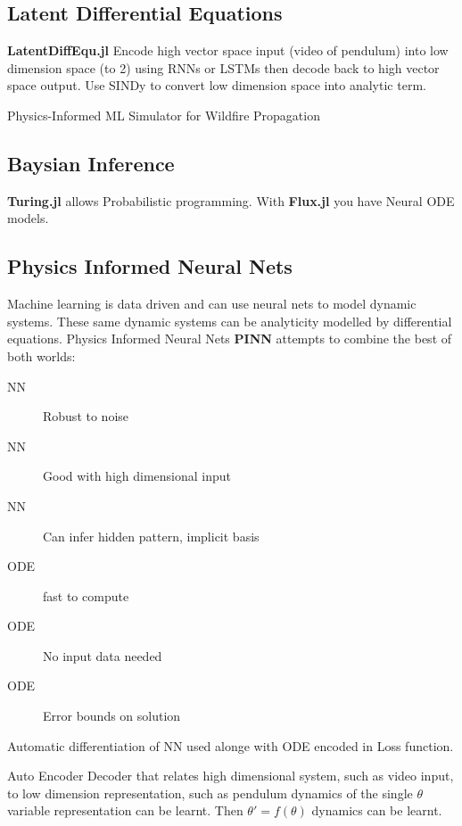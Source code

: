 \subsection{Latent Differential Equations}

{\bf LatentDiffEqu.jl} Encode high vector space input (video of pendulum)  into low dimension space (to 2) using RNNs or LSTMs  then decode back to high vector space output. Use SINDy to convert low dimension space into analytic term.

Physics-Informed ML Simulator for Wildfire Propagation

\subsection{Baysian Inference }

{\bf Turing.jl} allows Probabilistic programming. With {\bf Flux.jl} you have Neural ODE models.

\subsection{Physics Informed Neural Nets}

Machine learning is data driven and can use neural nets to model dynamic systems. These same dynamic systems can be analyticity modelled by differential equations. Physics Informed Neural Nets {\bf PINN} attempts to combine the best of both worlds:

\begin{description}
\item[NN] Robust to noise
\item[NN] Good with high dimensional input
\item [NN] Can infer hidden pattern, implicit basis
\item [ODE] fast to compute
\item [ODE] No input data needed
\item [ODE] Error bounds on solution
\end{description}

Automatic differentiation of NN used alonge with ODE encoded in Loss function.


Auto Encoder Decoder that relates  high dimensional  system, such as video input, to low dimension representation, such as pendulum dynamics of the single $\theta$ variable   representation can be learnt. Then $\theta' = f(\theta)$ dynamics  can be learnt.

